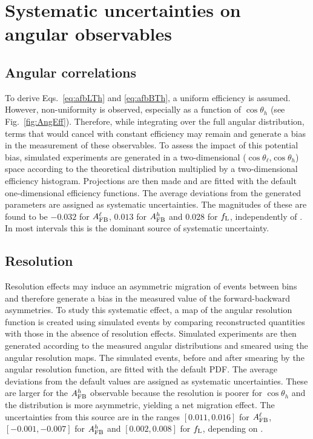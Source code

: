 \section{Systematic uncertainties on angular observables}
\subsection{Angular correlations}
 To derive Eqs.~\ref{eq:afbLTh} and \ref{eq:afbBTh}, a uniform
 efficiency is assumed. However, non-uniformity is observed,
 especially as a function of $\cos\theta_h$ (see
 Fig.~\ref{fig:AngEff}).  Therefore, while integrating over the full
 angular distribution, terms that would cancel with constant
 efficiency may remain and generate a bias in the measurement of these
 observables. To assess the impact of this potential bias, simulated
 experiments are generated in a two-dimensional ($\cos
 \theta_\ell$,$\cos \theta_h$) space according to the theoretical
 distribution multiplied by a two-dimensional efficiency histogram.
 Projections are then made and are fitted with the default
 one-dimensional efficiency functions. The average deviations from the
 generated parameters are assigned as systematic uncertainties. The
 magnitudes of these are found to be $-0.032$ for $A_{\rm FB}^\ell$,
 $0.013$ for $A_{\rm FB}^h$ and $0.028$ for $f_{\rm L}$, independently
 of \qsq.  In most \qsq intervals this is the dominant source of
 systematic uncertainty.


\subsection{Resolution}
 Resolution effects may induce an asymmetric migration of events
 between bins and therefore generate a bias in the measured value of
 the forward-backward asymmetries.  To study this systematic effect, a
 map of the angular resolution function is created using simulated
 events by comparing reconstructed quantities with those in the
 absence of resolution effects.  Simulated experiments are then
 generated according to the measured angular distributions and smeared
 using the angular resolution maps.  The simulated events, before and
 after smearing by the angular resolution function, are fitted with
 the default PDF.  The average deviations from the default values are
 assigned as systematic uncertainties.  These are larger for the
 $A_{\rm FB}^h$ observable because the resolution is poorer for
 $\cos\theta_h$ and the distribution is more asymmetric, yielding a
 net migration effect.  The uncertainties from this source are in the
 ranges $[0.011,0.016]$ for $A_{\rm FB}^\ell$, $[-0.001,-0.007]$ for
 $A_{\rm FB}^h$ and $[0.002,0.008]$ for $f_{\rm L}$, depending on
 \qsq.

